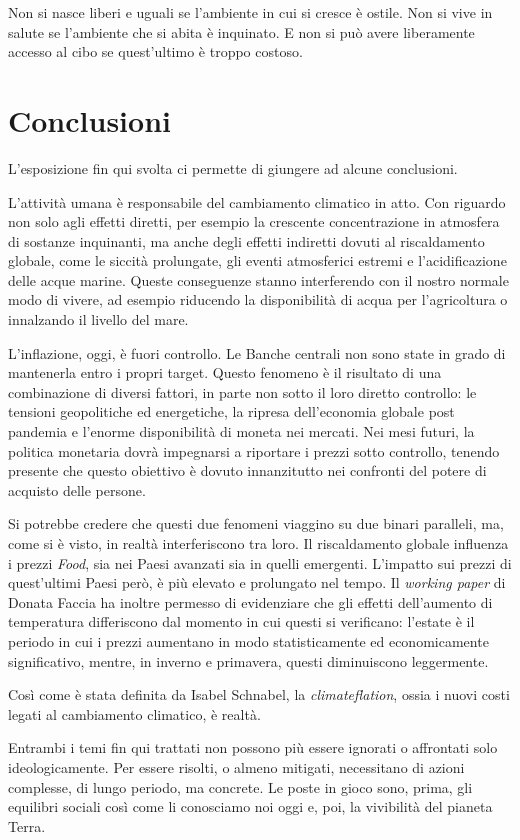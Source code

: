 Non si nasce liberi e uguali se l'ambiente in cui si cresce è ostile. Non si vive in salute se l'ambiente che si abita è inquinato. E non si può avere liberamente accesso al cibo se quest'ultimo è troppo costoso.

\backmatter
\chapter{Conclusioni}

L'esposizione fin qui svolta ci permette di giungere ad alcune conclusioni.

L'attività umana è responsabile del cambiamento climatico in atto. Con riguardo non solo agli effetti diretti, per esempio la crescente concentrazione in atmosfera di sostanze inquinanti, ma anche degli effetti indiretti dovuti al riscaldamento globale, come le siccità prolungate, gli eventi atmosferici estremi e l'acidificazione delle acque marine. Queste conseguenze stanno interferendo con il nostro normale modo di vivere, ad esempio riducendo la disponibilità di acqua per l'agricoltura o innalzando il livello del mare.

L'inflazione, oggi, è fuori controllo. Le Banche centrali non sono state in grado di mantenerla entro i propri target. Questo fenomeno è il risultato di una combinazione di diversi fattori, in parte non sotto il loro diretto controllo: le tensioni geopolitiche ed energetiche, la ripresa dell'economia globale post pandemia e l'enorme disponibilità di moneta nei mercati. Nei mesi futuri, la politica monetaria dovrà impegnarsi a riportare i prezzi sotto controllo, tenendo presente che questo obiettivo è dovuto innanzitutto nei confronti del potere di acquisto delle persone.

Si potrebbe credere che questi due fenomeni viaggino su due binari paralleli, ma, come si è visto, in realtà interferiscono tra loro. Il riscaldamento globale influenza i prezzi \textit{Food}, sia nei Paesi avanzati sia in quelli emergenti. L'impatto sui prezzi di quest'ultimi Paesi però, è più elevato e prolungato nel tempo. Il \textit{working paper} di Donata Faccia ha inoltre permesso di evidenziare che gli effetti dell'aumento di temperatura differiscono dal momento in cui questi si verificano: l'estate è il periodo in cui i prezzi aumentano in modo statisticamente ed economicamente significativo, mentre, in inverno e primavera, questi diminuiscono leggermente.

Così come è stata definita da Isabel Schnabel, la \textit{climateflation}, ossia i nuovi costi legati al cambiamento climatico, è realtà.

Entrambi i temi fin qui trattati non possono più essere ignorati o affrontati solo ideologicamente. Per essere risolti, o almeno mitigati, necessitano di azioni complesse, di lungo periodo, ma concrete. Le poste in gioco sono, prima, gli equilibri sociali così come li conosciamo noi oggi e, poi, la vivibilità del pianeta Terra.

